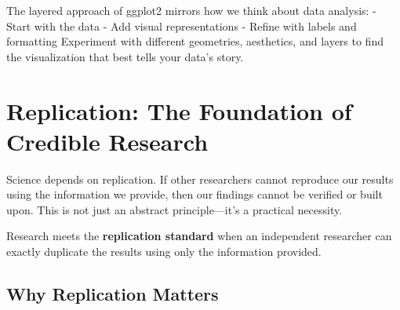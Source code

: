 \documentclass[
  letterpaper,
  DIV=11,
  numbers=noendperiod]{scrreprt}
\begin{document}
\begin{tcolorbox}[enhanced jigsaw, arc=.35mm, bottomrule=.15mm, bottomtitle=1mm, breakable, colback=white, colbacktitle=quarto-callout-tip-color!10!white, colframe=quarto-callout-tip-color-frame, coltitle=black, left=2mm, leftrule=.75mm, opacityback=0, opacitybacktitle=0.6, rightrule=.15mm, title=\textcolor{quarto-callout-tip-color}{\faLightbulb}\hspace{0.5em}{Building Intuition}, titlerule=0mm, toprule=.15mm, toptitle=1mm]

The layered approach of ggplot2 mirrors how we think about data
analysis: - Start with the data - Add visual representations - Refine
with labels and formatting Experiment with different geometries,
aesthetics, and layers to find the visualization that best tells your
data's story.

\end{tcolorbox}

\section{Replication: The Foundation of Credible
Research}\label{replication-the-foundation-of-credible-research}

Science depends on replication. If other researchers cannot reproduce
our results using the information we provide, then our findings cannot
be verified or built upon. This is not just an abstract principle---it's
a practical necessity.

\begin{tcolorbox}[enhanced jigsaw, arc=.35mm, bottomrule=.15mm, bottomtitle=1mm, breakable, colback=white, colbacktitle=quarto-callout-important-color!10!white, colframe=quarto-callout-important-color-frame, coltitle=black, left=2mm, leftrule=.75mm, opacityback=0, opacitybacktitle=0.6, rightrule=.15mm, title=\textcolor{quarto-callout-important-color}{\faExclamation}\hspace{0.5em}{The Replication Standard}, titlerule=0mm, toprule=.15mm, toptitle=1mm]

Research meets the \textbf{replication standard} when an independent
researcher can exactly duplicate the results using only the information
provided.

\end{tcolorbox}

\subsection{Why Replication Matters}\label{why-replication-matters}
\end{document}
